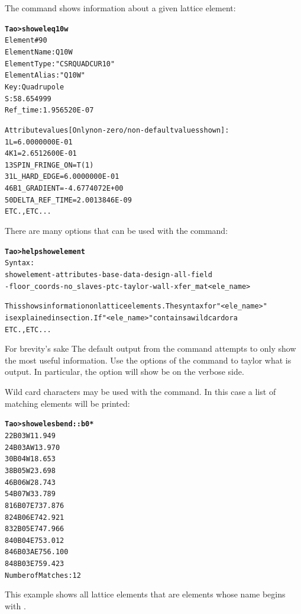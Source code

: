 \documentclass{hitec}
\newcommand{\BF}[1]{{\normalfont\textbf{#1}}}
\newenvironment{display}
  {\vspace*{-1.5ex} \begin{alltt}}
  {\end{alltt} \vspace*{-1.0ex}}
\begin{document}
The \tao {} command shows information about a given lattice element:

\begin{display}
  \BF{Tao> show ele q10w}
   Element #               90
   Element Name: Q10W
   Element Type: "CSR QUAD CUR  10"
   Element Alias: "Q10W"
   Key: Quadrupole
   S:             58.654999
   Ref_time:  1.956520E-07

   Attribute values [Only non-zero/non-default values shown]:
       1   L                            =  6.0000000E-01
       4   K1                           =  2.6512600E-01
      13   SPIN_FRINGE_ON               =  T (1)
      31   L_HARD_EDGE                  =  6.0000000E-01
      46   B1_GRADIENT                  = -4.6774072E+00
      50   DELTA_REF_TIME               =  2.0013846E-09
  ETC., ETC...
\end{display}

There are many options that can be used with the  command:
\begin{display}
  \BF{Tao> help show element}
  Syntax:
    show element {-attributes} {-base} {-data} {-design} {-all} {-field}
        {-floor_coords} {-no_slaves} {-ptc} {-taylor} {-wall} {-xfer_mat} <ele_name>

  This shows information on lattice elements. The syntax for "<ele_name>"
  is explained in section . If "<ele_name>" contains a wild card or a
  ETC., ETC...
\end{display}
For brevity's sake The default output from the  command attempts
to only show the most useful information. Use the options of the 
command to taylor what is output. In particular, the  option will show 
be on the verbose side.

Wild card characters may be used with the  command. In this case
a list of matching elements will be printed:
\begin{display}
  \BF{Tao> show ele sbend::b0*}
          22  B03W                                            11.949
          24  B03AW                                           13.970
          30  B04W                                            18.653
          38  B05W                                            23.698
          46  B06W                                            28.743
          54  B07W                                            33.789
         816  B07E                                           737.876
         824  B06E                                           742.921
         832  B05E                                           747.966
         840  B04E                                           753.012
         846  B03AE                                          756.100
         848  B03E                                           759.423
  Number of Matches: 12
\end{display}
This example shows all lattice elements that are  elements whose name begins
with .
\end{document}
